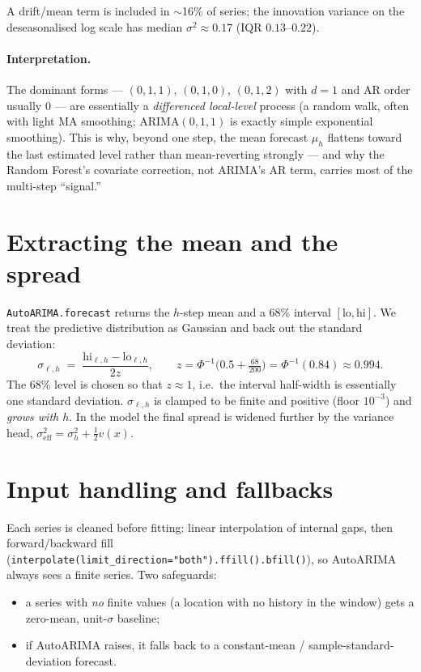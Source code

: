 \documentclass[11pt]{article}
\newcommand{\code}[1]{\texttt{\small #1}}
\begin{document}
\noindent
A drift/mean term is included in $\sim$16\% of series; the innovation variance on the
deseasonalised log scale has median $\sigma^2\approx0.17$ (IQR $0.13$--$0.22$).

\paragraph{Interpretation.} The dominant forms --- $(0,1,1)$, $(0,1,0)$, $(0,1,2)$ with
$d{=}1$ and AR order usually $0$ --- are essentially a \emph{differenced local-level} process
(a random walk, often with light MA smoothing; ARIMA$(0,1,1)$ is exactly simple exponential
smoothing). This is why, beyond one step, the mean forecast $\mu_h$ flattens toward the last
estimated level rather than mean-reverting strongly --- and why the Random Forest's
covariate correction, not ARIMA's AR term, carries most of the multi-step ``signal.''

\section{Extracting the mean and the spread}
\code{AutoARIMA.forecast} returns the $h$-step mean and a $68\%$ interval $[\text{lo},\text{hi}]$.
We treat the predictive distribution as Gaussian and back out the standard deviation:
\[
\sigma_{\ell,h} \;=\; \frac{\text{hi}_{\ell,h}-\text{lo}_{\ell,h}}{2z},\qquad
z=\Phi^{-1}\!\Big(0.5+\tfrac{68}{200}\Big)=\Phi^{-1}(0.84)\approx 0.994 .
\]
The $68\%$ level is chosen so that $z\approx1$, i.e.\ the interval half-width is essentially
one standard deviation. $\sigma_{\ell,h}$ is clamped to be finite and positive (floor $10^{-3}$)
and \emph{grows with $h$}. In the model the final spread is widened further by the variance
head, $\sigma_{\text{eff}}^2=\sigma_h^2+\tfrac12 v(x)$.

\section{Input handling and fallbacks}
Each series is cleaned before fitting: linear interpolation of internal gaps, then
forward/backward fill (\code{interpolate(limit\_direction="both").ffill().bfill()}), so
AutoARIMA always sees a finite series. Two safeguards:
\begin{itemize}
\item a series with \emph{no} finite values (a location with no history in the window) gets a
      zero-mean, unit-$\sigma$ baseline;
\item if AutoARIMA raises, it falls back to a constant-mean / sample-standard-deviation forecast.
\end{itemize}
\end{document}
